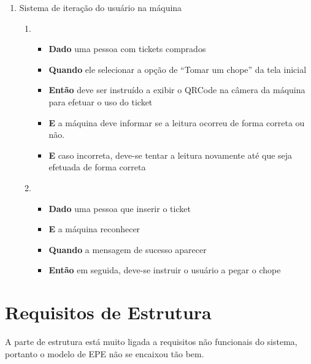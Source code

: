 \begin{enumerate}
			\item Sistema de iteração do usuário na máquina
				\begin{enumerate}
					\item 
						\begin{itemize}
							\item \textbf{Dado} uma pessoa com tickets comprados
							\item \textbf{Quando} ele selecionar a opção de “Tomar um chope” da tela inicial
							\item \textbf{Então} deve ser instruído a exibir o QRCode na câmera da máquina para efetuar o uso do ticket
							\item \textbf{E} a máquina deve informar se a leitura ocorreu de forma correta ou não.
							\item \textbf{E} caso incorreta, deve-se tentar a leitura novamente até que seja efetuada de forma correta
						\end{itemize}

					\item 
						\begin{itemize}
							\item \textbf{Dado} uma pessoa que inserir o ticket
							\item \textbf{E} a máquina reconhecer
							\item \textbf{Quando} a mensagem de sucesso aparecer
							\item \textbf{Então} em seguida, deve-se instruir o usuário a pegar o chope
						\end{itemize}
				\end{enumerate}

		\end{enumerate}

	\section[Requisitos de Estrutura]{Requisitos de Estrutura}
		A parte de estrutura está muito ligada a requisitos não funcionais do sistema, portanto o modelo de EPE não se encaixou tão bem.

